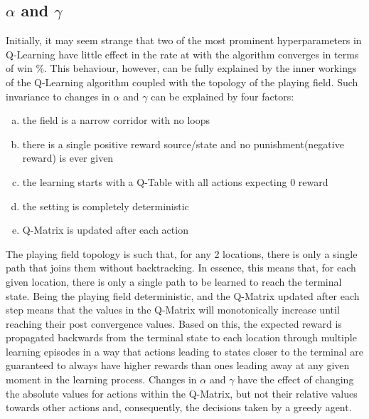 \documentclass[11pt]{article}
\begin{document}
    \subsection{$\alpha$ and $\gamma$}\label{sec:quali:gamma}
        Initially, it may seem strange that two of the most prominent hyperparameters in Q-Learning have little effect in the rate at with the algorithm converges in terms of win \%. This behaviour, however, can be fully explained by the inner workings of the Q-Learning algorithm coupled with the topology of the playing field. Such invariance to changes in $\alpha$ and $\gamma$ can be explained by four factors:
        \begin{enumerate}[a)]
            \item the field is a narrow corridor with no loops
            \item there is a single positive reward source/state and no punishment(negative reward) is ever given
            \item the learning starts with a Q-Table with all actions expecting 0 reward
            \item the setting is completely deterministic
            \item Q-Matrix is updated after each action
        \end{enumerate}
        The playing field topology is such that, for any 2 locations, there is only a single path that joins them without backtracking. In essence, this means that, for each given location, there is only a single path to be learned to reach the terminal state. Being the playing field deterministic, and the Q-Matrix updated after each step means that the values in the Q-Matrix will monotonically increase until reaching their post convergence values. Based on this, the expected reward is propagated backwards from the terminal state to each location through multiple learning episodes in a way that actions leading to states closer to the terminal are guaranteed to always have higher rewards than ones leading away at any given moment in the learning process. Changes in $\alpha$ and $\gamma$ have the effect of changing the absolute values for actions within the Q-Matrix, but not their relative values towards other actions and, consequently, the decisions taken by a greedy agent.
\end{document}
